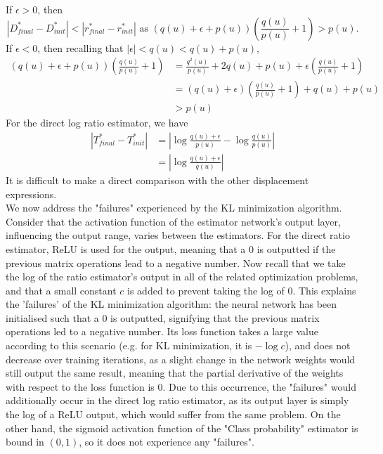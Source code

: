 \documentclass[honours,12pt]{unswthesis}
\numberwithin{equation}{section}
\theoremstyle{definition}
\begin{document}
If $\epsilon>0$, then
\[|D^*_{final}-D^*_{init}|<|r^*_{final}-r^*_{init}|\text{ as }(q(u)+\epsilon+p(u))(\frac{q(u)}{p(u)}+1)>p(u).\]
If $\epsilon<0$, then recalling that $|\epsilon| < q(u) < q(u)+p(u)$,
\begin{align*}
(q(u)+\epsilon+p(u))(\frac{q(u)}{p(u)}+1)&=\frac{q^2(u)}{p(u)}+2q(u)+p(u)+\epsilon \left(\frac{q(u)}{p(u)}+1\right)\\
&=(q(u)+\epsilon)\left(\frac{q(u)}{p(u)}+1\right)+q(u)+p(u)\\
&>p(u)
\end{align*}
For the direct log ratio estimator, we have
\begin{align*}
|T^*_{final}-T^*_{init}|&=\left|\log \frac{q(u)+\epsilon}{p(u)}-\log \frac{q(u)}{p(u)}\right|\\
&=\left|\log \frac{q(u)+\epsilon}{q(u)}\right|
\end{align*}
It is difficult to make a direct comparison with the other displacement expressions.\\
We now address the "failures" experienced by the KL minimization algorithm. Consider that the activation function of the estimator network's output layer, influencing the output range, varies between the estimators. For the direct ratio estimator, ReLU is used for the output, meaning that a 0 is outputted if the previous matrix operations lead to a negative number. Now recall that we take the log of the ratio estimator's output in all of the related optimization problems, and that a small constant $c$ is added to prevent taking the log of $0$. This explains the 'failures' of the KL minimization algorithm: the neural network has been initialised such that a $0$ is outputted, signifying that the previous matrix operations led to a negative number. Its loss function takes a large value according to this scenario (e.g. for KL minimization, it is $-\log c$), and does not decrease over training iterations, as a slight change in the network weights would still output the same result, meaning that the partial derivative of the weights with respect to the loss function is $0$. Due to this occurrence, the "failures" would additionally occur in the direct log ratio estimator, as its output layer is simply the log of a ReLU output, which would suffer from the same problem. On the other hand, the sigmoid activation function of the "Class probability" estimator is bound in $(0,1)$, so it does not experience any "failures".\\
\end{document}
